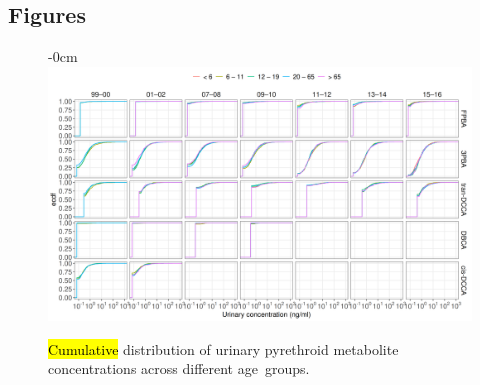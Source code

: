 \documentclass[toxics,article,accept,pdftex,moreauthors]{Definitions/mdpi}
\begin{document}
\subsection{Figures}

\vspace{-11pt}\begin{figure}[H]

\begin{adjustwidth}{-\extralength}{0cm}
~~~~~~~~\includegraphics[width=0.91\linewidth]{figures/figa1_ecdf}
\end{adjustwidth}
\caption{\hl{Cumulative} %
 distribution of urinary pyrethroid metabolite concentrations across different age~groups.}\label{fig:figa1}
\end{figure}
\unskip
\end{document}

